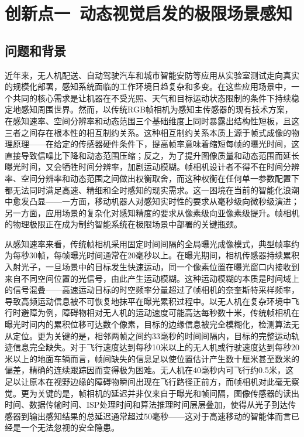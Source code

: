 \section{创新点一\ 动态视觉启发的极限场景感知}

\subsection{问题和背景}

近年来，无人机配送、自动驾驶汽车和城市智能安防等应用从实验室测试走向真实的规模化部署，感知系统面临的工作环境日趋复杂和多变。在这些应用场景中，一个共同的核心需求是让机器在不受光照、天气和目标运动状态限制的条件下持续稳定地感知周围世界。然而，以传统RGB帧相机为感知主传感器的现有技术方案，在感知速率、空间分辨率和动态范围三个基础维度上同时暴露出结构性短板，且这三者之间存在根本性的相互制约关系。这种相互制约关系本质上源于帧式成像的物理原理——在给定的传感器硬件条件下，提高帧率意味着缩短每帧的曝光时间，这直接导致信噪比下降和动态范围压缩；反之，为了提升图像质量和动态范围而延长曝光时间，又会牺牲时间分辨率，加剧运动模糊。帧相机设计者不得不在时间分辨率、空间分辨率和动态范围之间做出权衡取舍，而这种权衡在任何单一参数配置下都无法同时满足高速、精细和全时感知的现实需求。这一困境在当前的智能化浪潮中愈发凸显——一方面，移动机器人对感知实时性的要求从毫秒级向微秒级演进；另一方面，应用场景的复杂化对感知精度的要求从像素级向亚像素级提升。帧相机的物理极限正在成为制约智能系统在极限场景中部署的关键瓶颈。

从感知速率来看，传统帧相机采用固定时间间隔的全局曝光成像模式，典型帧率约为每秒30帧，每帧曝光时间通常在20毫秒以上。在曝光期间，相机传感器持续累积入射光子，一旦场景中的目标发生快速运动，同一个像素位置在曝光窗口内接收到来自不同空间位置的光信号，由此产生运动模糊。这种运动模糊的本质是时间域上的信号混叠——高速运动目标的时空频率分量超过了帧相机的奈奎斯特采样频率，导致高频运动信息被不可恢复地抹平在曝光累积过程中。以无人机在复杂环境中飞行时避障为例，障碍物相对无人机的运动速度可能高达每秒数十米，传统帧相机在曝光时间内的累积位移可达数个像素，目标的边缘信息被完全模糊化，检测算法无从定位。更为关键的是，相邻两帧之间约33毫秒的时间间隔内，目标的完整运动轨迹信息完全缺失。对于飞行速度达到每秒10米以上的无人机或行驶速度达到每秒20米以上的地面车辆而言，帧间缺失的信息足以使位置估计产生数十厘米甚至数米的偏差，精确的连续跟踪因而变得极为困难。无人机在40毫秒内可飞行约0.5米，这足以让原本在视野边缘的障碍物瞬间出现在飞行路径正前方，而帧相机对此毫无察觉。更为关键的是，帧相机的延迟并非仅来自于曝光和帧间隔，图像传感器的读出时间、数据传输时间、ISP处理时间和算法推理时间层层叠加，使得从光子到达传感器到输出感知结果的总延迟通常超过50毫秒——这对于高速移动的智能体而言已经是一个无法忽视的安全隐患。

